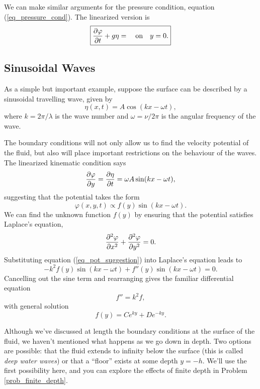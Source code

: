 We can make similar arguments for the pressure condition, equation (\ref{eq_pressure_cond}).  The linearized version is
\begin{equation}
\label{eq_pressure_cond_lin}
\boxed{
\frac{\partial {\varphi}}{\partial {t}} + g\eta = \quad \text{on} \quad y=0.
}
\end{equation}




\subsection{Sinusoidal Waves}

As a simple but important example, suppose the surface can be described by a sinusoidal travelling wave, given by
\begin{equation}
\eta(x, t) = A \cos(kx - \omega t),
\end{equation}
where $k = 2\pi / \lambda$ is the wave number and $\omega = \nu / 2\pi$ is the angular frequency of the wave.

The boundary conditions will not only allow us to find the velocity potential of the fluid, but also will place important restrictions on the behaviour of the waves.  The linearized kinematic condition says
\[
\frac{\partial {\varphi}}{\partial {y}} = \frac{\partial {\eta}}{\partial {t}} = \omega A \sin(kx - \omega t),
\]
suggesting that the potential takes the form
\begin{equation}
\label{eq_pot_suggestion}
\varphi(x, y, t) \propto f(y) \sin (kx - \omega t).
\end{equation}
We can find the unknown function $f(y)$ by ensuring that the potential satisfies Laplace's equation,
\[
\frac{\partial^2 {\varphi}}{\partial {x}^2} + \frac{\partial^2 {\varphi}}{\partial {y}^2} = 0.
\]
Substituting equation (\ref{eq_pot_suggestion}) into Laplace's equation leads to 
\[
-k^2 f(y) \sin (kx - \omega t) + f''(y) \sin (kx - \omega t) = 0.
\]
Cancelling out the sine term and rearranging gives the familiar differential equation
\[
f'' = k^2 f,
\]
with general solution
\[
f(y) = C e^{ky} + D e^{-ky}.
\]

Although we've discussed at length the boundary conditions at the surface of the fluid, we haven't mentioned what happens as we go down in depth.  Two options are possible:  that the fluid extends to infinity below the surface (this is called \emph{deep water waves}) or that a ``floor'' exists at some depth $y = -h$.  We'll use the first possibility here, and you can explore the effects of finite depth in Problem \ref{prob_finite_depth}.

